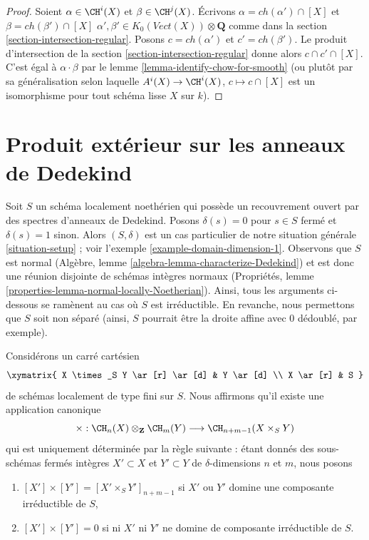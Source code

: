 \begin{proof}
Soient $\alpha \in \CH^i(X)$ et $\beta \in \CH^j(X)$. Écrivons
$\alpha = ch(\alpha') \cap [X]$ et $\beta = ch(\beta') \cap [X]$
$\alpha', \beta' \in K_0(\textit{Vect}(X)) \otimes \mathbf{Q}$
comme dans la section \ref{section-intersection-regular}.
Posons $c = ch(\alpha')$ et $c' = ch(\beta')$.
Le produit d'intersection de la section \ref{section-intersection-regular}
donne alors $c \cap c' \cap [X]$. C'est égal à $\alpha \cdot \beta$
par le lemme \ref{lemma-identify-chow-for-smooth} (ou plutôt par sa
généralisation selon laquelle $A^i(X) \to \CH^i(X)$, $c \mapsto c \cap [X]$
est un isomorphisme pour tout schéma lisse $X$ sur $k$).
\end{proof}








\section{Produit extérieur sur les anneaux de Dedekind}
\label{section-exterior-product-dim-1}

\noindent
Soit $S$ un schéma localement noethérien qui possède un recouvrement ouvert
par des spectres d'anneaux de Dedekind. Posons $\delta(s) = 0$ pour $s \in S$ fermé
et $\delta(s) = 1$ sinon. Alors $(S, \delta)$ est un cas particulier de notre
situation générale \ref{situation-setup} ; voir
l'exemple \ref{example-domain-dimension-1}.
Observons que $S$ est normal
(Algèbre, lemme \ref{algebra-lemma-characterize-Dedekind})
et est donc une réunion disjointe de schémas intègres normaux
(Propriétés, lemme \ref{properties-lemma-normal-locally-Noetherian}).
Ainsi, tous les arguments ci-dessous se ramènent au cas où $S$ est
irréductible. En revanche, nous permettons que $S$ soit non séparé (ainsi, $S$
pourrait être la droite affine avec $0$ dédoublé, par exemple).

\medskip\noindent
Considérons un carré cartésien
$$
\xymatrix{
X \times_S Y \ar[r] \ar[d] & Y \ar[d] \\
X \ar[r] & S
}
$$
de schémas localement de type fini sur $S$. Nous affirmons qu'il existe une application canonique
$$
\times :
\CH_n(X) \otimes_{\mathbf{Z}} \CH_m(Y)
\longrightarrow
\CH_{n + m - 1}(X \times_S Y)
$$
qui est uniquement déterminée par la règle suivante :
étant donnés des sous-schémas fermés intègres $X' \subset X$
et $Y' \subset Y$ de $\delta$-dimensions $n$ et $m$, nous posons
\begin{enumerate}
\item $[X'] \times [Y'] = [X' \times_S Y']_{n + m - 1}$ si
$X'$ ou $Y'$ domine une composante irréductible de $S$,
\item $[X'] \times [Y'] = 0$ si ni $X'$ ni $Y'$ ne domine de
composante irréductible de $S$.
\end{enumerate}

